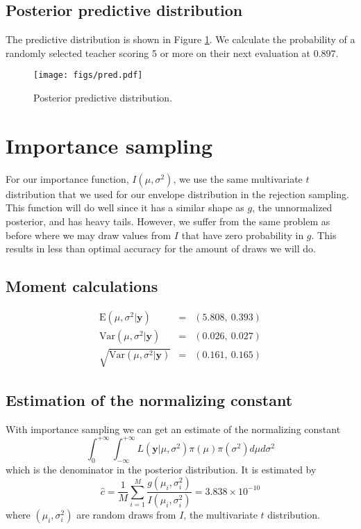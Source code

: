 \documentclass[12pt]{article}
\newcommand{\m}[1]{\mathbf{\bm{#1}}}
\begin{document}
\subsection{Posterior predictive distribution}

\noindent The predictive distribution is shown in Figure \ref{prediction}. We calculate the probability of a randomly selected teacher scoring 5 or more on their next evaluation at $0.897$.

\begin{figure}
    \begin{center}
    \texttt{[image: figs/pred.pdf]}
    \end{center}
    \caption{Posterior predictive distribution.}
    \label{prediction}
\end{figure}

\section{Importance sampling}

\noindent For our importance function, $I(\mu, \sigma^2)$, we use the same multivariate $t$ distribution that we used for our envelope distribution in the rejection sampling. This function will do well since it has a similar shape as $g$, the unnormalized posterior, and has heavy tails. However, we suffer from the same problem as before where we may draw values from $I$ that have zero probability in $g$. This results in less than optimal accuracy for the amount of draws we will do.

\subsection{Moment calculations}

\begin{eqnarray*}
\mathrm{E}(\mu,\sigma^2|\m{y}) &=& (5.808,~0.393) \\
\mathrm{Var}(\mu, \sigma^2|\m{y}) &=& (0.026,~0.027) \\
\sqrt{\mathrm{Var}(\mu, \sigma^2|\m{y})} &=& (0.161,~0.165)
\end{eqnarray*}

\subsection{Estimation of the normalizing constant}

\noindent With importance sampling we can get an estimate of the normalizing constant
\[ \int_0^{+\infty}\int_{-\infty}^{+\infty} L(\m{y}|\mu,\sigma^2)\pi(\mu)\pi(\sigma^2)d\mu d\sigma^2 \]
which is the denominator in the posterior distribution. It is estimated by
\[ \hat{c} = \frac{1}{M}\sum_{i=1}^M \frac{g(\mu_i, \sigma^2_i)}{I(\mu_i,\sigma^2_i)} = 3.838\times 10^{-10} \]
where $(\mu_i, \sigma^2_i)$ are random draws from $I$, the multivariate $t$ distribution.
\bigskip
\end{document}
